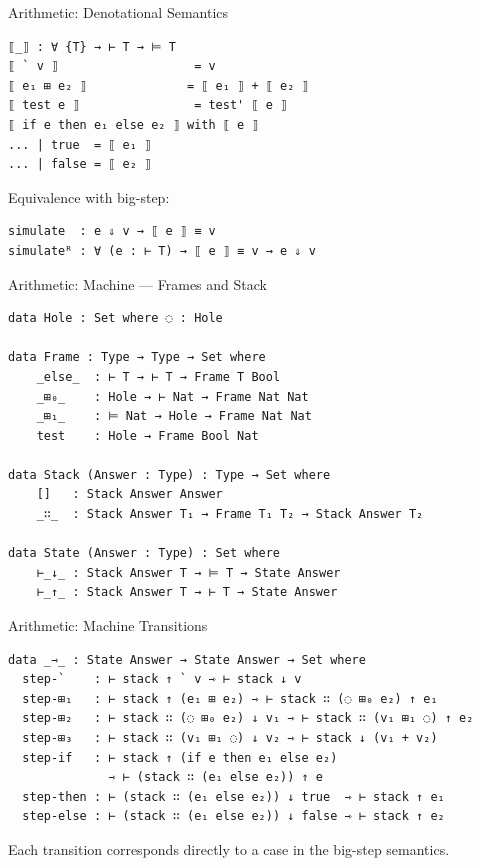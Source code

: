 \documentclass[10pt,compress,aspectratio=169]{beamer}
\begin{document}
\begin{frame}[fragile]{Arithmetic: Denotational Semantics}
\begin{verbatim}
⟦_⟧ : ∀ {T} → ⊢ T → ⊨ T
⟦ ` v ⟧                   = v
⟦ e₁ ⊞ e₂ ⟧              = ⟦ e₁ ⟧ + ⟦ e₂ ⟧
⟦ test e ⟧                = test' ⟦ e ⟧
⟦ if e then e₁ else e₂ ⟧ with ⟦ e ⟧
... | true  = ⟦ e₁ ⟧
... | false = ⟦ e₂ ⟧
\end{verbatim}

  Equivalence with big-step:
\begin{verbatim}
simulate  : e ⇓ v → ⟦ e ⟧ ≡ v
simulateᴿ : ∀ (e : ⊢ T) → ⟦ e ⟧ ≡ v → e ⇓ v
\end{verbatim}
\end{frame}

\begin{frame}[fragile]{Arithmetic: Machine — Frames and Stack}
\begin{verbatim}
data Hole : Set where ◌ : Hole

data Frame : Type → Type → Set where
    _𝚎𝚕𝚜𝚎_  : ⊢ T → ⊢ T → Frame T Bool
    _⊞₀_    : Hole → ⊢ Nat → Frame Nat Nat
    _⊞₁_    : ⊨ Nat → Hole → Frame Nat Nat
    test    : Hole → Frame Bool Nat

data Stack (Answer : Type) : Type → Set where
    []   : Stack Answer Answer
    _∷_  : Stack Answer T₁ → Frame T₁ T₂ → Stack Answer T₂

data State (Answer : Type) : Set where
    ⊢_↓_ : Stack Answer T → ⊨ T → State Answer
    ⊢_↑_ : Stack Answer T → ⊢ T → State Answer
\end{verbatim}
\end{frame}

\begin{frame}[fragile]{Arithmetic: Machine Transitions}
\begin{verbatim}
data _⇾_ : State Answer → State Answer → Set where
  step-`    : ⊢ stack ↑ ` v ⇾ ⊢ stack ↓ v
  step-⊞₁   : ⊢ stack ↑ (e₁ ⊞ e₂) ⇾ ⊢ stack ∷ (◌ ⊞₀ e₂) ↑ e₁
  step-⊞₂   : ⊢ stack ∷ (◌ ⊞₀ e₂) ↓ v₁ ⇾ ⊢ stack ∷ (v₁ ⊞₁ ◌) ↑ e₂
  step-⊞₃   : ⊢ stack ∷ (v₁ ⊞₁ ◌) ↓ v₂ ⇾ ⊢ stack ↓ (v₁ + v₂)
  step-𝚒𝚏   : ⊢ stack ↑ (if e then e₁ else e₂)
              ⇾ ⊢ (stack ∷ (e₁ 𝚎𝚕𝚜𝚎 e₂)) ↑ e
  step-𝚝𝚑𝚎𝚗 : ⊢ (stack ∷ (e₁ 𝚎𝚕𝚜𝚎 e₂)) ↓ true  ⇾ ⊢ stack ↑ e₁
  step-𝚎𝚕𝚜𝚎 : ⊢ (stack ∷ (e₁ 𝚎𝚕𝚜𝚎 e₂)) ↓ false ⇾ ⊢ stack ↑ e₂
\end{verbatim}
  Each transition corresponds directly to a case in the big-step semantics.
\end{frame}
\end{document}
